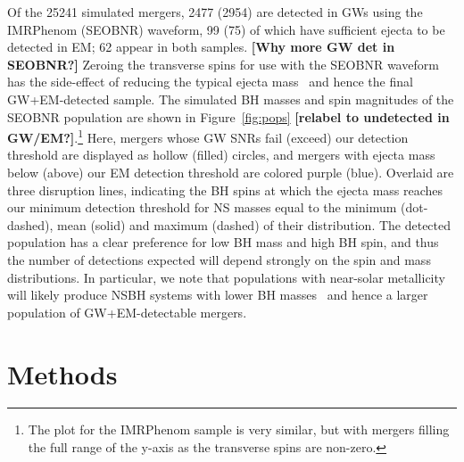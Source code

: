 \documentclass[twocolumn]{aastex63}
\begin{document}
Of the 25241 simulated mergers, 2477 (2954) are detected in GWs using the IMRPhenom (SEOBNR) waveform, 99 (75) of which have sufficient ejecta to be detected in EM; 62 appear in both samples. {\bf [Why more GW det in SEOBNR?]} Zeroing the transverse spins for use with the SEOBNR waveform has the side-effect of reducing the typical ejecta mass~\citep{Foucart_etal:2018} and hence the final GW+EM-detected sample. The simulated BH masses and spin magnitudes of the SEOBNR population are shown in Figure~\ref{fig:pops} {\bf [relabel to undetected in GW/EM?]}.\footnote{The plot for the IMRPhenom sample is very similar, but with mergers filling the full range of the y-axis as the transverse spins are non-zero.} Here, mergers whose GW SNRs fail (exceed) our detection threshold are displayed as hollow (filled) circles, and mergers with ejecta mass below (above) our EM detection threshold are colored purple (blue). Overlaid are three disruption lines, indicating the BH spins at which the ejecta mass reaches our minimum detection threshold for NS masses equal to the minimum (dot-dashed), mean (solid) and maximum (dashed) of their distribution. The detected population has a clear preference for low BH mass and high BH spin, and thus the number of detections expected will depend strongly on the spin and mass distributions. In particular, we note that populations with near-solar metallicity will likely produce NSBH systems with lower BH masses~\citep{Kruckow_etal:2018} and hence a larger population of GW+EM-detectable mergers.

\begin{figure*}[ht!]
\caption{Ground-truth (left) and inferred (right) properties of simulated NSBH binaries. (Left) Most systems are not detected in GWs (empty circles). Those with low BH mass and high BH spin are most likely to produce ejecta and thus EM emission (blue circles). (Right) Posterior inference for these systems, clearly indicating the preferred region of parameter space.\label{fig:pops}}
\end{figure*}

\section{Methods} \label{sec:methods}
\end{document}
